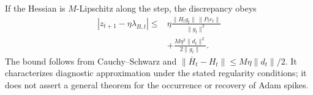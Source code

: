 If the Hessian is $M$-Lipschitz along the step, the discrepancy obeys
\begin{equation}
\begin{aligned}
|z_{t+1}-\eta\lambda_{B,t}|
\leq{}&
\eta\frac{\|H_tg_t\|\,\|P_te_t\|}{\|g_t\|^2}\\
&+\frac{M\eta^2\|d_t\|^2}{2\|g_t\|}.
\end{aligned}
\label{eq:adam-response-error-bound}
\end{equation}
The bound follows from Cauchy--Schwarz and
$\|\overline H_t-H_t\|\leq M\eta\|d_t\|/2$.
It characterizes diagnostic approximation under the stated regularity
conditions; it does not assert a general theorem for the occurrence
or recovery of Adam spikes.
